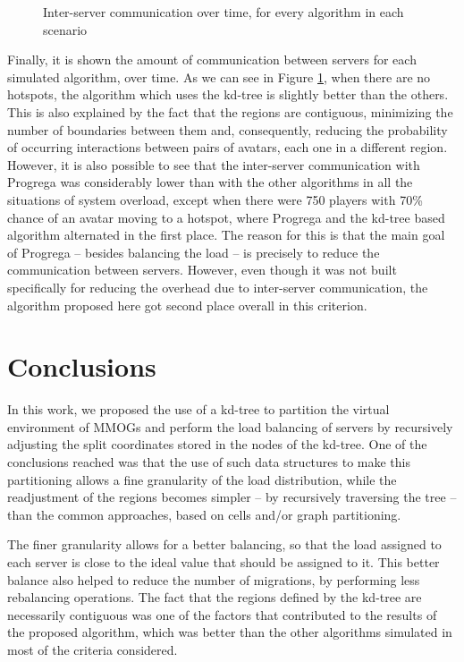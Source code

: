 \documentclass[acmjacm]{acmtrans2m}
\newcommand{\figurecaption}{Figure}
\begin{document}
\begin{figure}[!t]
	\caption{Inter-server communication over time, for every algorithm in each scenario}
	\label{fig:overhead}
\end{figure}

Finally, it is shown the amount of communication between servers for each simulated algorithm, over time. As we can see in \figurecaption{} \ref{fig:overhead}, when there are no hotspots, the algorithm which uses the kd-tree is slightly better than the others. This is also explained by the fact that the regions are contiguous, minimizing the number of boundaries between them and, consequently, reducing the probability of occurring interactions between pairs of avatars, each one in a different region. However, it is also possible to see that the inter-server communication with Progrega was considerably lower than with the other algorithms in all the situations of system overload, except when there were 750 players with 70\% chance of an avatar moving to a hotspot, where Progrega and the kd-tree based algorithm alternated in the first place. The reason for this is that the main goal of Progrega -- besides balancing the load -- is precisely to reduce the communication between servers. However, even though it was not built specifically for reducing the overhead due to inter-server communication, the algorithm proposed here got second place overall in this criterion.

\section{Conclusions}
\label{sec:conc}

In this work, we proposed the use of a kd-tree to partition the virtual environment of MMOGs and perform the load balancing of servers by recursively adjusting the split coordinates stored in the nodes of the kd-tree. One of the conclusions reached was that the use of such data structures to make this partitioning allows a fine granularity of the load distribution, while the readjustment of the regions becomes simpler -- by recursively traversing the tree -- than the common approaches, based on cells and/or graph partitioning.

The finer granularity allows for a better balancing, so that the load assigned to each server is close to the ideal value that should be assigned to it. This better balance also helped to reduce the number of migrations, by performing less rebalancing operations. The fact that the regions defined by the kd-tree are necessarily contiguous was one of the factors that contributed to the results of the proposed algorithm, which was better than the other algorithms simulated in most of the criteria considered.
\end{document}
